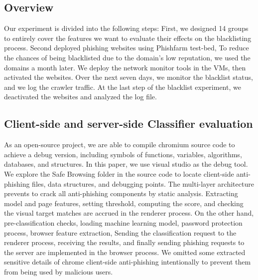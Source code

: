 \documentclass[letterpaper,twocolumn,10pt]{article}
\begin{document}
\subsection{Overview}
Our experiment is divided into the following steps: 
First, we designed 14 groups to entirely cover the features we want to evaluate their effects on the blacklisting process. Second deployed phishing websites using Phishfarm test-bed, 
To reduce the chances of being blacklisted due to the domain's low reputation, we used the domains a month later.
We deploy the network monitor tools in the VMs, then activated the websites. Over the next seven days, we monitor the blacklist status, and we log the crawler traffic.
At the last step of the blacklist experiment, we deactivated the websites and analyzed the log file.

\subsection{Client-side and server-side Classifier evaluation}


As an open-source project, we are able to compile chromium source code to achieve a debug version, including symbols of functions, variables, algorithms, databases, and structures. In this paper, we use visual studio as the debug tool. We explore the Safe Browsing folder in the source code to locate client-side anti-phishing files, data structures, and debugging points. 
The multi-layer architecture prevents to crack all anti-phishing components by static analysis. Extracting model and page features, setting threshold, computing the score, and checking the visual target matches are accrued in the renderer process. On the other hand, pre-classification checks, loading machine learning model, password protection process, browser feature extraction, Sending the classification request to the renderer process, receiving the results, and finally sending phishing requests to the server are implemented in the browser process.
We omitted some extracted sensitive details of chrome client-side anti-phishing intentionally to prevent them from being used by malicious users. 
\end{document}
